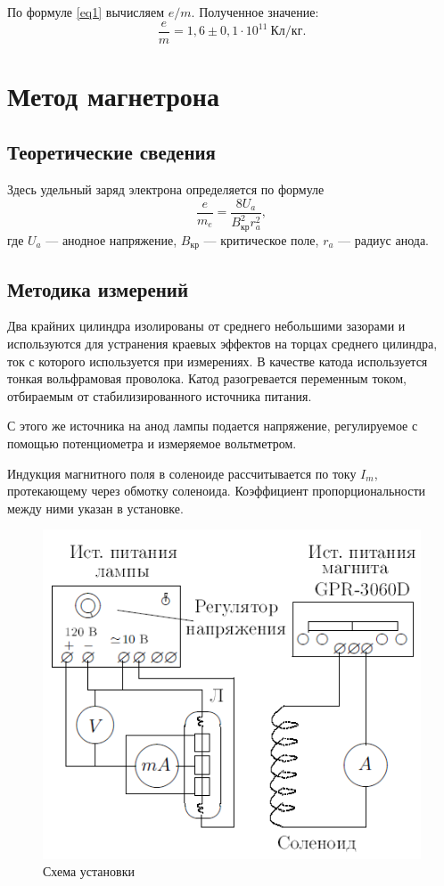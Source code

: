 \documentclass[a4paper, 12pt]{article}
\begin{document}
\vspace{3cm}

По формуле \eqref{eq1} вычисляем $e/m$. Полученное значение: $$\frac{e}{m} = 1,6\pm0,1\cdot 10^{11}~Кл/кг.$$

\section{Метод магнетрона}

\subsection{Теоретические сведения}

Здесь удельный заряд электрона определяется по формуле
\begin{equation}\label{eq2}
\dfrac{e}{m_e} = \dfrac{8U_a}{B_{\text{кр}}^2r_a^2},
\end{equation}
где $U_a$ --- анодное напряжение, $B_{\text{кр}}$ --- критическое поле, $r_a$ --- радиус анода.

\subsection{Методика измерений}

Два крайних цилиндра изолированы от среднего небольшими зазорами и используются для устранения краевых эффектов на торцах среднего цилиндра, ток с которого используется при измерениях. В качестве катода используется тонкая вольфрамовая проволока. Катод разогревается переменным током, отбираемым от стабилизированного источника питания. 

С этого же источника на анод лампы подается напряжение, регулируемое с помощью потенциометра и измеряемое вольтметром.

Индукция магнитного поля в соленоиде рассчитывается по току $I_m$, протекающему через обмотку соленоида. Коэффициент пропорциональности между ними указан в установке.

\begin{figure}[h!]
  \begin{center}
    \includegraphics[scale = 1]{2.png}
  \end{center}
  \caption{Схема установки}
  \label{ris4}
\end{figure}
\end{document}
